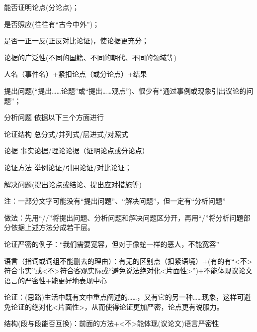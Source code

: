 \begin{asparaenum}[(1)]
\item 能否证明论点(分论点)；
\item 是否照应(往往有``古今中外'')；
\item 是否一正一反(正反对比论证)，使论据更充分；
\item 论据的广泛性(不同的国籍、不同的朝代、不同的领域等)
\end{asparaenum}

人名（事件名）+紧扣论点（或分论点）+结果

\begin{asparaenum}[(1)]
\item 提出问题(``提出\ldots{}\ldots{}论题''或``提出\ldots{}\ldots{}观点'')、很少有``通过事例或现象引出议论的问题''；
\item 分析问题
依据以下三个方面进行
\begin{compactdesc}
\item[论证结构]总分式/并列式/层进式/对照式
\item[论据]事实论据/理论论据（证明论点或分论点）
\item[论证方法]举例论证/引用论证/对比论证；
\end{compactdesc}
\item 解决问题(提出论点或结论、提出应对措施等)
\end{asparaenum}
注：一部分文字可能没有``提出问题''、``解决问题''，但一定有``分析问题''\par
做法：先用``//''将提出问题、分析问题和解决问题区分开，再用``/''将分析问题部分依据上述方法分成若干层。

论证严密的例子：“我们需要宽容，但对于像蛇一样的恶人，不能宽容”
\begin{asparaenum}[(1)]
\item 语言（指词或词组不能删去的理由）：有无的区别点（扣紧语境）+(有的有``<不>符合事实''或<不>符合客观实际或``避免说法绝对化<片面性>'')+不能体现议论文语言的严密性+能更好地表现中心
\item 论证：(思路)生活中既有文中重点阐述的\ldots{}\ldots{}，又有它的另一种\ldots{}\ldots{}现象，这样可避免论证的绝对化\mbox{<片面性>}，从而使得论证更加严密，论点更有说服力。
\item 结构(段与段能否互换)：前面的方法+<不>能体现(议论文)语言严密性
\end{asparaenum}

